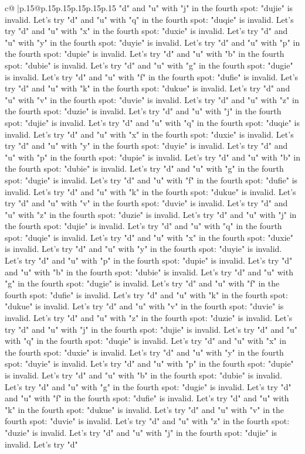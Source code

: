 \documentclass{article}
\begin{document}
{\begin{supertabular}{c@{$\;$}|p{.15\linewidth}@{}p{.15\linewidth}p{.15\linewidth}p{.15\linewidth}p{.15\linewidth}p{.15\linewidth}}
{{{"d" and "u" with "j" in the fourth spot: "dujie" is invalid. Let's try "d" and "u" with "q" in the fourth spot: "duqie" is invalid. Let's try "d" and "u" with "x" in the fourth spot: "duxie" is invalid. Let's try "d" and "u" with "y" in the fourth spot: "duyie" is invalid. Let's try "d" and "u" with "p" in the fourth spot: "dupie" is invalid. Let's try "d" and "u" with "b" in the fourth spot: "dubie" is invalid. Let's try "d" and "u" with "g" in the fourth spot: "dugie" is invalid. Let's try "d" and "u" with "f" in the fourth spot: "dufie" is invalid. Let's try "d" and "u" with "k" in the fourth spot: "dukue" is invalid. Let's try "d" and "u" with "v" in the fourth spot: "duvie" is invalid. Let's try "d" and "u" with "z" in the fourth spot: "duzie" is invalid. Let's try "d" and "u" with "j" in the fourth spot: "dujie" is invalid. Let's try "d" and "u" with "q" in the fourth spot: "duqie" is invalid. Let's try "d" and "u" with "x" in the fourth spot: "duxie" is invalid. Let's try "d" and "u" with "y" in the fourth spot: "duyie" is invalid. Let's try "d" and "u" with "p" in the fourth spot: "dupie" is invalid. Let's try "d" and "u" with "b" in the fourth spot: "dubie" is invalid. Let's try "d" and "u" with "g" in the fourth spot: "dugie" is invalid. Let's try "d" and "u" with "f" in the fourth spot: "dufie" is invalid. Let's try "d" and "u" with "k" in the fourth spot: "dukue" is invalid. Let's try "d" and "u" with "v" in the fourth spot: "duvie" is invalid. Let's try "d" and "u" with "z" in the fourth spot: "duzie" is invalid. Let's try "d" and "u" with "j" in the fourth spot: "dujie" is invalid. Let's try "d" and "u" with "q" in the fourth spot: "duqie" is invalid. Let's try "d" and "u" with "x" in the fourth spot: "duxie" is invalid. Let's try "d" and "u" with "y" in the fourth spot: "duyie" is invalid. Let's try "d" and "u" with "p" in the fourth spot: "dupie" is invalid. Let's try "d" and "u" with "b" in the fourth spot: "dubie" is invalid. Let's try "d" and "u" with "g" in the fourth spot: "dugie" is invalid. Let's try "d" and "u" with "f" in the fourth spot: "dufie" is invalid. Let's try "d" and "u" with "k" in the fourth spot: "dukue" is invalid. Let's try "d" and "u" with "v" in the fourth spot: "duvie" is invalid. Let's try "d" and "u" with "z" in the fourth spot: "duzie" is invalid. Let's try "d" and "u" with "j" in the fourth spot: "dujie" is invalid. Let's try "d" and "u" with "q" in the fourth spot: "duqie" is invalid. Let's try "d" and "u" with "x" in the fourth spot: "duxie" is invalid. Let's try "d" and "u" with "y" in the fourth spot: "duyie" is invalid. Let's try "d" and "u" with "p" in the fourth spot: "dupie" is invalid. Let's try "d" and "u" with "b" in the fourth spot: "dubie" is invalid. Let's try "d" and "u" with "g" in the fourth spot: "dugie" is invalid. Let's try "d" and "u" with "f" in the fourth spot: "dufie" is invalid. Let's try "d" and "u" with "k" in the fourth spot: "dukue" is invalid. Let's try "d" and "u" with "v" in the fourth spot: "duvie" is invalid. Let's try "d" and "u" with "z" in the fourth spot: "duzie" is invalid. Let's try "d" and "u" with "j" in the fourth spot: "dujie" is invalid. Let's try "d" }}}
\end{supertabular}}
\end{document}
